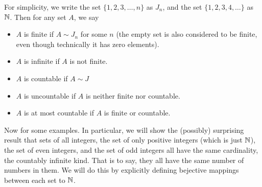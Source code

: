 \documentclass[../../templates/section]{subfiles}
\begin{document}
\begin{definition}
For simplicity, we write the set $\{1, 2, 3,\ldots, n\}$ as $J_n$, and
the set $\{1, 2, 3, 4, \ldots\}$ as $\mathbb{N}$. Then for any set $A$, we say
\begin{itemize}
    \item $A$ is finite if $A \sim J_n$ for some $n$ (the empty set is also
        considered to be finite, even though technically it has zero elements).
    \item $A$ is infinite if $A$ is not finite.
    \item $A$ is countable if $A \sim J$
    \item $A$ is uncountable if $A$ is neither finite nor countable. 
    \item $A$ is at most countable if $A$ is finite or countable.
\end{itemize}
\end{definition}

Now for some examples. In particular, we will show the (possibly) surprising
result that sets of all integers, the set of only positive integers (which is
just $\mathbb{N}$), the set of even integers, and the set of odd integers all have the
same cardinality, the countably infinite kind.  That is to say, they all have
the same number of numbers in them.  We will do this by explicitly defining
bejective mappings between each set to $\mathbb{N}$.
\end{document}
